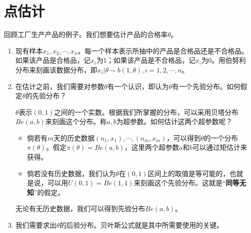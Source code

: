 \section{点估计}
\begin{example}
回顾工厂生产产品的例子。我们想要估计产品的合格率$\theta$。
\begin{enumerate}
    \item 现有样本$x_1,x_2,\cdots,x_n$。每一个样本表示所抽中的产品是合格品还是不合格品。如果该产品是合格品，记$x_i$为1；如果该产品是不合格品，记$x_i$为0。用伯努利分布来刻画该数据分布，即$x_i|\theta \sim b(1,\theta),i=1,2,\cdots,n$。
    \item 在估计之前，我们需要对参数$\theta$有一个认识，即认为$\theta$有一个先验分布。如何假定$\theta$的先验分布？

    $\theta$表示$(0,1)$之间的一个实数。根据我们所掌握的分布，可以采用贝塔分布$Be(a,b)$来刻画这个分布。称$a,b$为超参数。如何估计这两个超参数呢？
    \begin{itemize}
    \item 倘若有$m$天的历史数据$(n_1,x_1),\cdots,(n_m,x_m)$，可以得到$\theta$的一个分布$\pi(\theta)$。假定$\pi(\theta) = Be(a,b)$，这里两个超参数$a$和$b$可以通过矩估计来获得。
    \item 倘若没有历史数据，我们认为$\theta$在$(0,1)$区间上的取值是等可能的，也就是说，可以用$U(0,1) = Be(1,1)$来刻画这个先验分布。这就是“\textbf{同等无知}”的假定。
\end{itemize}
无论有无历史数据，我们可以得到先验分布$Be(a,b)$。
\item  我们需要求出$\theta$的后验分布。贝叶斯公式就是其中所需要使用的关键。


\end{enumerate}
\end{example}
